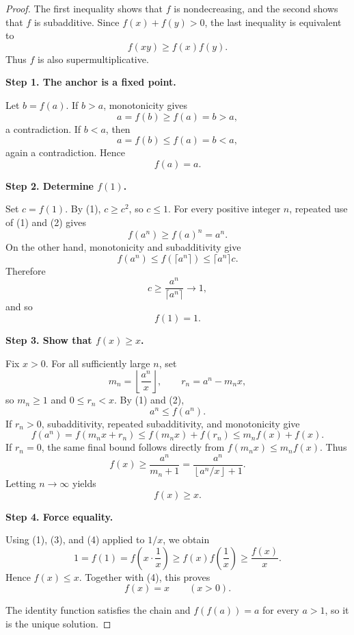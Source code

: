 
\begin{dlsummary}[title={\bfseries Solution 35. The Subadditive--Supermultiplicative Squeeze},breakable]

\begin{proof}
The first inequality shows that $f$ is nondecreasing, and the second
shows that $f$ is subadditive. Since $f(x)+f(y)>0$, the last inequality
is equivalent to
\[
f(xy)\geq f(x)f(y). \tag{1}
\]
Thus $f$ is also supermultiplicative.

\medskip
\noindent
\textbf{Step 1. The anchor is a fixed point.}

Let $b=f(a)$. If $b>a$, monotonicity gives
\[
a=f(b)\geq f(a)=b>a,
\]
a contradiction. If $b<a$, then
\[
a=f(b)\leq f(a)=b<a,
\]
again a contradiction. Hence
\[
f(a)=a. \tag{2}
\]

\medskip
\noindent
\textbf{Step 2. Determine $f(1)$.}

Set $c=f(1)$. By (1), $c\geq c^2$, so $c\leq1$. For every positive
integer $n$, repeated use of (1) and (2) gives
\[
f(a^n)\geq f(a)^n=a^n.
\]
On the other hand, monotonicity and subadditivity give
\[
f(a^n)\leq f(\lceil a^n\rceil)
\leq \lceil a^n\rceil c.
\]
Therefore
\[
c\geq\frac{a^n}{\lceil a^n\rceil}\longrightarrow1,
\]
and so
\[
f(1)=1. \tag{3}
\]

\medskip
\noindent
\textbf{Step 3. Show that $f(x)\geq x$.}

Fix $x>0$. For all sufficiently large $n$, set
\[
m_n=\left\lfloor\frac{a^n}{x}\right\rfloor,
\qquad r_n=a^n-m_nx,
\]
so $m_n\geq1$ and $0\leq r_n<x$. By (1) and (2),
\[
a^n\leq f(a^n).
\]
If $r_n>0$, subadditivity, repeated subadditivity, and monotonicity give
\[
f(a^n)=f(m_nx+r_n)
\leq f(m_nx)+f(r_n)
\leq m_nf(x)+f(x).
\]
If $r_n=0$, the same final bound follows directly from
$f(m_nx)\leq m_nf(x)$. Thus
\[
f(x)\geq\frac{a^n}{m_n+1}
=\frac{a^n}{\left\lfloor a^n/x\right\rfloor+1}.
\]
Letting $n\to\infty$ yields
\[
f(x)\geq x. \tag{4}
\]

\medskip
\noindent
\textbf{Step 4. Force equality.}

Using (1), (3), and (4) applied to $1/x$, we obtain
\[
1=f(1)=f\!\left(x\cdot\frac1x\right)
\geq f(x)f\!\left(\frac1x\right)
\geq\frac{f(x)}x.
\]
Hence $f(x)\leq x$. Together with (4), this proves
\[
f(x)=x\qquad(x>0).
\]

The identity function satisfies the chain and $f(f(a))=a$ for every
$a>1$, so it is the unique solution.
\end{proof}

\end{dlsummary}